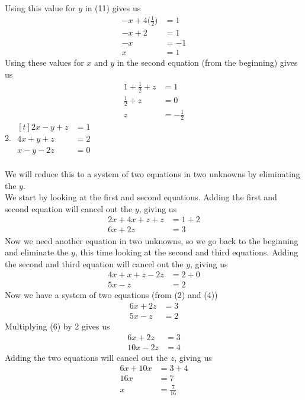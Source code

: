 \documentclass[12pt]{article}
\begin{document}
Using this value for $y$ in (11) gives us
\begin{align*}
-x+4\bigg(\displaystyle \frac{1}{2}\bigg)&=1 \\
-x+2&=1 \\
-x&=-1 \\
x&=1
\end{align*}
Using these values for $x$ and $y$ in the second equation (from the beginning) gives us
\begin{align*}
1+\displaystyle \frac{1}{2}+z&=1 \\
\displaystyle \frac{1}{2}+z&=0 \\
z&=-\displaystyle \frac{1}{2}
\end{align*}
\setcounter{equation}{0}
2. $\begin{aligned}[t]
2x-y+z&=1 \\
4x+y+z&=2 \\
x-y-2z&=0
\end{aligned}$ \\
\\
We will reduce this to a system of two equations in two unknowns by eliminating the $y$. \\
We start by looking at the first and second equations. Adding the first and second equation will cancel out the $y$, giving us
\begin{align}
2x+4x+z+z&=1+2 \\
6x+2z&=3
\end{align}
Now we need another equation in two unknowns, so we go back to the beginning and eliminate the $y$, this time looking at the second and third equations. Adding the second and third equation will cancel out the $y$, giving us
\begin{align}
4x+x+z-2z&=2+0 \\
5x-z&=2
\end{align}
Now we have a system of two equations (from (2) and (4))
\begin{align}
6x+2z&=3 \\
5x-z&=2
\end{align}
Multiplying (6) by 2 gives us
\begin{align*}
6x+2z&=3 \\
10x-2z&=4
\end{align*}
Adding the two equations will cancel out the $z$, giving us
\begin{align*}
6x+10x&=3+4 \\
16x&=7 \\
x&=\displaystyle \frac{7}{16}
\end{align*}
\end{document}
